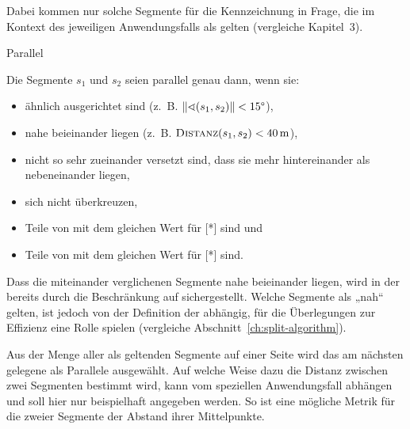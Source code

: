\documentclass[../main/thesis.tex]{subfiles}
\begin{document}
Dabei kommen nur solche Segmente für die Kennzeichnung in Frage, die im Kontext des jeweiligen Anwendungsfalls als  gelten (vergleiche Kapitel~3).

\begin{algorithmhere}{Parallel}
\label{alg:Parallel}
\begin{algorithmic}
	\State Die Segmente $s_1$ und $s_2$ seien parallel genau dann, wenn sie:
	\begin{itemize}[nosep,leftmargin=3.5em]
		\item ähnlich ausgerichtet sind (z.~B. $|\!\;\!|\sphericalangle (s_1, s_2)|\!\;\!| < 15\degree$),
		\item nahe beieinander liegen (z.~B. $\textproc{Distanz}(s_1, s_2) < \unit[40]{m}$),
		\item nicht so sehr zueinander versetzt sind, dass sie mehr hintereinander als nebeneinander liegen,  %
		\item sich nicht überkreuzen,  %
		\item Teile von  mit dem gleichen Wert für [*] sind und
		\item Teile von  mit dem gleichen Wert für [*] sind.
	\end{itemize}
\EndFunction
\end{algorithmic}
\end{algorithmhere}

Dass die miteinander verglichenen Segmente nahe beieinander liegen, wird in der  bereits durch die Beschränkung auf  sichergestellt.
Welche Segmente als „nah“ gelten, ist jedoch von der Definition der  abhängig, für die Überlegungen zur Effizienz eine Rolle spielen (vergleiche Abschnitt~\ref{ch:split-algorithm}).


Aus der Menge aller als  geltenden Segmente auf einer Seite wird das am nächsten gelegene als Parallele ausgewählt.
Auf welche Weise dazu die Distanz zwischen zwei Segmenten bestimmt wird, kann vom speziellen Anwendungsfall abhängen und soll hier nur beispielhaft angegeben werden.
So ist eine mögliche Metrik für die  zweier Segmente der Abstand ihrer Mittelpunkte.
\end{document}
